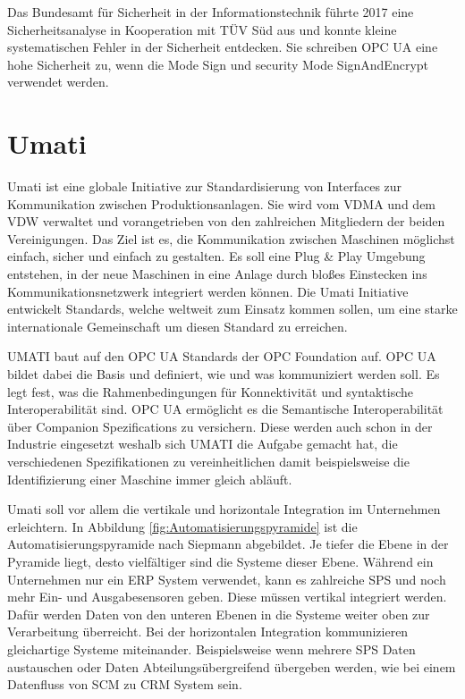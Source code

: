 \documentclass[a4paper, 12pt, oneside]{scrbook}
\begin{document}
		Das Bundesamt für Sicherheit in der Informationstechnik führte 2017 eine Sicherheitsanalyse in Kooperation mit TÜV Süd aus und konnte kleine systematischen Fehler in der Sicherheit entdecken. Sie schreiben OPC UA eine hohe Sicherheit zu, wenn die  Mode Sign und security Mode SignAndEncrypt verwendet werden. \cite{damm_opc_2017}
		
		
	
	\section{Umati}
		
		Umati ist eine globale Initiative zur Standardisierung von Interfaces zur Kommunikation zwischen Produktionsanlagen. Sie wird vom \ac{VDMA} und dem \ac{VDW} verwaltet und vorangetrieben von den zahlreichen Mitgliedern der beiden Vereinigungen. Das Ziel ist es, die Kommunikation zwischen Maschinen möglichst einfach, sicher und einfach zu gestalten. Es soll eine Plug \& Play Umgebung entstehen, in der neue Maschinen in eine Anlage durch bloßes Einstecken ins Kommunikationsnetzwerk integriert werden können. Die Umati Initiative entwickelt Standards, welche weltweit zum Einsatz kommen sollen, um eine starke internationale Gemeinschaft um diesen Standard zu erreichen. \cite{noauthor_umati_2023}
		
		\ac{UMATI} baut auf den OPC UA Standards der OPC Foundation auf. OPC UA bildet dabei die Basis und definiert, wie und was kommuniziert werden soll. Es legt fest, was die Rahmenbedingungen für Konnektivität und syntaktische Interoperabilität sind. \cite{noauthor_umati_2023} OPC UA ermöglicht es die Semantische Interoperabilität über Companion Spezifications zu versichern. Diese werden auch schon in der Industrie eingesetzt weshalb sich \ac{UMATI} die Aufgabe gemacht hat, die verschiedenen Spezifikationen zu vereinheitlichen damit beispielsweise die Identifizierung einer Maschine immer gleich abläuft.
		
		Umati soll vor allem die vertikale und horizontale Integration im Unternehmen erleichtern. In Abbildung \ref{fig:Automatisierungspyramide} ist die Automatisierungspyramide nach Siepmann abgebildet. Je tiefer die Ebene in der Pyramide liegt, desto vielfältiger sind die Systeme dieser Ebene. Während ein Unternehmen nur ein \ac{ERP} System verwendet, kann es zahlreiche SPS und noch mehr Ein- und Ausgabesensoren geben. Diese müssen vertikal integriert werden. Dafür werden Daten von den unteren Ebenen in die Systeme weiter oben zur Verarbeitung überreicht. Bei der horizontalen Integration kommunizieren gleichartige Systeme miteinander. Beispielsweise wenn mehrere SPS Daten austauschen oder Daten Abteilungsübergreifend übergeben werden, wie bei einem Datenfluss von SCM zu CRM System sein. 
		
\end{document}

